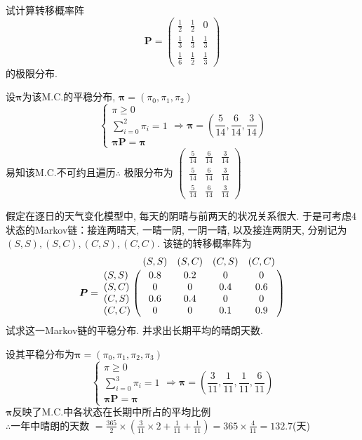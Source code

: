 \begin{problem}{3.17}
试计算转移概率阵
\[
	\bm{P} =
	\begin{pmatrix}
		\frac{1}{2} & \frac{1}{2} & 0           \\
		\frac{1}{3} & \frac{1}{3} & \frac{1}{3} \\
		\frac{1}{6} & \frac{1}{2} & \frac{1}{3}
	\end{pmatrix}
\]
的极限分布.
\end{problem}
\begin{solution}
	设$\bm{\pi}$为该M.C.的平稳分布, $\bm{\pi}= (\pi_0, \pi_1, \pi_2)$\\
	\[
		\begin{cases}
			\pi \geqslant 0               \\
			\sum\limits^2_{i=0} \pi_i = 1 \\
			\bm{\pi}\bm{P} = \bm{\pi}
		\end{cases}\Rightarrow
		\bm{\pi} = \left(\frac{5}{14}, \frac{6}{14}, \frac{3}{14}\right)
	\]
	易知该M.C.不可约且遍历\quad $\therefore$ 极限分布为
	$
		\begin{pmatrix}
			\frac{5}{14} & \frac{6}{14} & \frac{3}{14} \\
			\frac{5}{14} & \frac{6}{14} & \frac{3}{14} \\
			\frac{5}{14} & \frac{6}{14} & \frac{3}{14}
		\end{pmatrix}
	$
\end{solution}

\begin{problem}{3.18}
假定在逐日的天气变化模型中, 每天的阴晴与前两天的状况关系很大. 于是可考虑$4$状态的Markov链：接连两晴天, 一晴一阴, 一阴一晴, 以及接连两阴天, 分别记为$(S, S), (S, C), (C, S), (C, C)$. 该链的转移概率阵为
\[\bm{P} =
	\bordermatrix{
		~ & (S,S) & (S,C) & (C,S) & (C,C) \cr
		(S,S) & 0.8 & 0.2 & 0 & 0 \cr
		(S,C) & 0 & 0 & 0.4 & 0.6 \cr
		(C,S) & 0.6 & 0.4 & 0 & 0 \cr
		(C,C) & 0 & 0 & 0.1 & 0.9 \cr}
\]
试求这一Markov链的平稳分布. 并求出长期平均的晴朗天数.
\end{problem}
\begin{solution}
	设其平稳分布为$\bm{\pi}= (\pi_0, \pi_1, \pi_2, \pi_3)$\\
	\[
		\begin{cases}
			\pi \geqslant 0               \\
			\sum\limits^3_{i=0} \pi_i = 1 \\
			\bm{\pi}\bm{P} = \bm{\pi}
		\end{cases} \Rightarrow
		\bm{\pi} = \left(\frac{3}{11}, \frac{1}{11}, \frac{1}{11}, \frac{6}{11}\right)
	\]
	$\bm{\pi}$反映了M.C.中各状态在长期中所占的平均比例\\
	$\therefore$一年中晴朗的天数 $ = \frac{365}{2} \times \left(\frac{3}{11} \times 2 + \frac{1}{11} + \frac{1}{11}\right) = 365\times \frac{4}{11} = 132.7$(天)
\end{solution}

